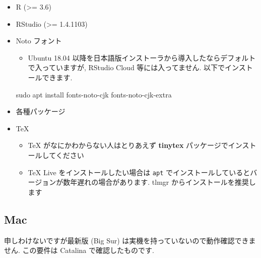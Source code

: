 \documentclass[
]{ltjsarticle}
\newenvironment{Shaded}{\begin{snugshade}}{\end{snugshade}}
\newcommand{\FunctionTok}[1]{\textcolor[rgb]{0.00,0.00,0.00}{#1}}
\newcommand{\NormalTok}[1]{#1}
\providecommand{\tightlist}{%
  \setlength{\itemsep}{0pt}\setlength{\parskip}{0pt}}
\begin{document}
\begin{itemize}
\tightlist
\item
  R (\textgreater= 3.6)
\item
  RStudio (\textgreater= 1.4.1103)
\item
  Noto フォント

  \begin{itemize}
  \tightlist
  \item
    Ubuntu 18.04 以降を日本語版インストーラから導入したならデフォルトで入っていますが, RStudio Cloud 等には入ってません. 以下でインストールできます.
  \end{itemize}

\begin{Shaded}
\begin{Highlighting}[]
\FunctionTok{sudo}\NormalTok{ apt install fonts{-}noto{-}cjk fonts{-}noto{-}cjk{-}extra}
\end{Highlighting}
\end{Shaded}
\item
  各種パッケージ
\item
  TeX

  \begin{itemize}
  \tightlist
  \item
    TeX がなにかわからない人はとりあえず \textbf{tinytex} パッケージでインストールしてください
  \item
    TeX Live をインストールしたい場合は \texttt{apt} でインストールしているとバージョンが数年遅れの場合があります. tlmgr からインストールを推奨します
  \end{itemize}
\end{itemize}

\hypertarget{mac}{%
\subsection{Mac}\label{mac}}

申しわけないですが最新版 (Big Sur) は実機を持っていないので動作確認できません. この要件は Catalina で確認したものです.
\end{document}
